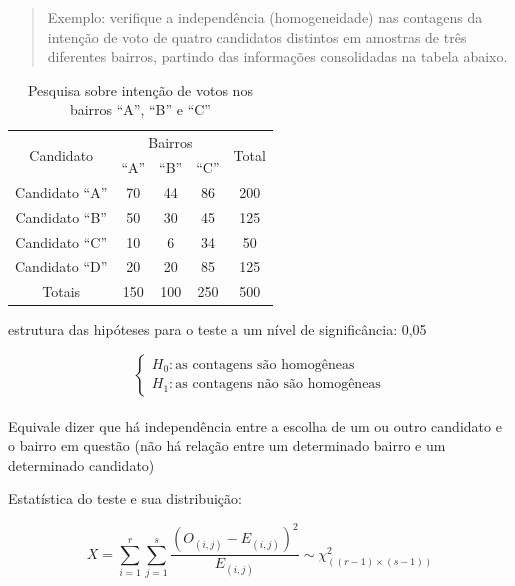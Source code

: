 \documentclass[
]{book}
\begin{document}
\begin{quote}
Exemplo: verifique a independência (homogeneidade) nas contagens da intenção de voto de quatro candidatos distintos em amostras de três diferentes bairros, partindo das informações consolidadas na tabela abaixo.
\end{quote}

\hfill\break

\begin{table}[h]
\centering
\caption{Pesquisa sobre intenção de votos nos bairros ``A'', ``B'' e ``C''}
\begin{tabular}{|c|c|c|c|c|}
\hline 
\multirow{2}{*}{Candidato}   & \multicolumn{3}{c|}{Bairros} & \multirow{2}{*}{Total} \\ 
\cline{2-4}
         & ``A'' & ``B'' & ``C'' &  \\
\hline       
  Candidato ``A''  & 70 & 44 & 86 & 200 \\
\hline
  Candidato ``B'' & 50 & 30 & 45 & 125 \\
\hline
  Candidato ``C'' & 10 & 6 & 34 & 50 \\
\hline
  Candidato ``D''  & 20 & 20 & 85 & 125 \\
\hline
  Totais & 150  & 100  & 250 & 500 \\
\hline 
\end{tabular} 
\end{table}

\hfill\break

\hfill\break

estrutura das hipóteses para o teste a um nível de significância: 0,05

\hfill\break

\[
\begin{cases}
H_{0}: \text{as contagens são homogêneas} \\
H_{1}: \text{as contagens não são homogêneas}
\end{cases}
\]\\

Equivale dizer que há independência entre a escolha de um ou outro candidato e o bairro em questão (não há relação entre um determinado bairro e um determinado candidato)

\hfill\break

Estatística do teste e sua distribuição:

\[
X=\sum_{i=1}^r\sum_{j=1}^s \frac{(O_{(i,j)} - E_{(i,j)})^2}{E_{(i,j)}}   \sim \chi^{2}_{((r-1)\times(s-1))} 
\]

\hfill\break
\end{document}
